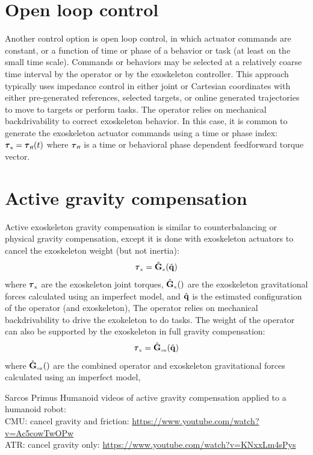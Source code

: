 \documentclass[letterpaper,12pt,fullpage]{article}
\newcommand{\ff}{{\mbox {\tiny ff}}}
\newcommand{\myx}{{\mbox {\tiny x}}}
\newcommand{\ox}{{\mbox {\tiny ox}}}
\begin{document}
\section{Open loop control}

Another control option is open loop control, in which actuator commands are
constant, or a function of time or phase of a behavior or task
(at least on the small time scale).
Commands or behaviors may be selected at a relatively coarse time interval
by the operator or by the exoskeleton controller.
This approach typically 
uses impedance control in either joint or
Cartesian coordinates
with either pre-generated references, selected targets,
or online generated trajectories to move to targets or perform tasks.
The operator relies on mechanical backdrivability 
to correct exoskeleton behavior.
In this case, it is common to generate the exoskeleton actuator commands using
a time or phase index:
$\vtau_{\myx} = \vtau_{\ff}(t)$ where $\vtau_{\ff}$ is a time or behavioral phase
dependent feedforward torque vector.

\section{Active gravity compensation}

Active exoskeleton gravity compensation is similar 
to counterbalancing or physical gravity compensation, except it is done
with exoskeleton actuators to cancel the exoskeleton weight (but not inertia):
\begin{equation}
\vtau_{\myx} = \hat{\mG}_{\myx}(\hat{\vq})
\end{equation}
where $\vtau_{\myx}$ are the exoskeleton joint torques, 
$\hat{\mG}_{\myx}()$ are the exoskeleton
gravitational forces calculated using an imperfect model, 
and $\hat{{\bf q}}$ is the estimated configuration of the operator (and exoskeleton),
The operator relies on mechanical backdrivability to drive
the exokeleton to do tasks.
The weight of the operator can also be supported by the exoskeleton in
full gravity compensation:
\begin{equation}
\vtau_{\myx} = \hat{\mG}_{\ox}(\hat{\vq})
\end{equation}
where $\hat{\mG}_{\ox}()$ are the combined operator and exoskeleton
gravitational forces calculated using an imperfect model, 

Sarcos Primus Humanoid videos of active gravity compensation applied
to a humanoid robot:\\
CMU: cancel gravity and friction: \url{https://www.youtube.com/watch?v=Ac5cowTwOPw}\\
ATR: cancel gravity only: \url{https://www.youtube.com/watch?v=KNxxLm4sPys}
\end{document}
